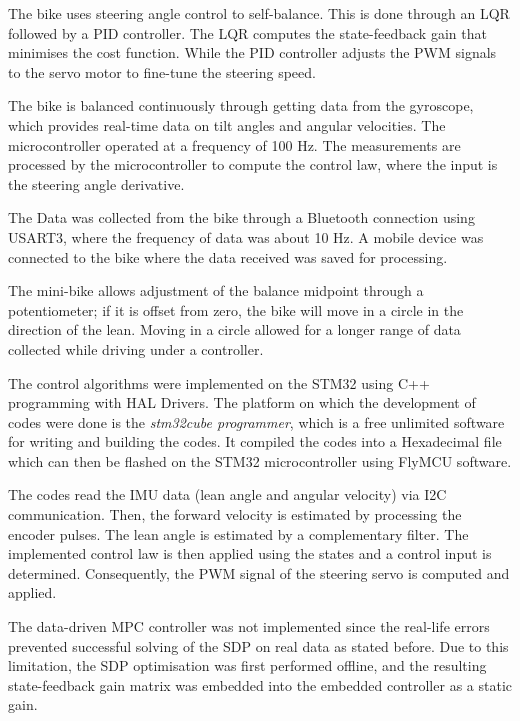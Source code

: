 
The bike uses steering angle control to self-balance. This is done through an LQR followed by a PID controller. The LQR computes the state-feedback gain that minimises the cost function. While the PID controller adjusts the PWM signals to the servo motor to fine-tune the steering speed.

The bike is balanced continuously through getting data from the gyroscope, which provides real-time data on tilt angles and angular velocities. The microcontroller operated at a frequency of 100 Hz. The measurements are processed by the microcontroller to compute the control law, where the input is the steering angle derivative.

The Data was collected from the bike through a Bluetooth connection using USART3, where the frequency of data was about 10 Hz. A mobile device was connected to the bike where the data received was saved for processing.

The mini-bike allows adjustment of the balance midpoint through a potentiometer; if it is offset from zero, the bike will move in a circle in the direction of the lean. Moving in a circle allowed for a longer range of data collected while driving under a controller.

The control algorithms were implemented on the STM32 using C++ programming with HAL Drivers.
The platform on which the development of codes were done is the \textit{stm32cube programmer}, which is a free unlimited software for writing and building the codes. It compiled the codes into a Hexadecimal file which can then be flashed on the STM32 microcontroller using FlyMCU software.

The codes read the IMU data (lean angle and angular velocity) via I2C communication. Then, the forward velocity is estimated by processing the encoder pulses. The lean angle is estimated by a complementary filter. The implemented control law is then applied using the states and a control input is determined. Consequently, the PWM signal of the steering servo is computed and applied.

The data-driven MPC controller was not implemented since the real-life errors prevented successful solving of the SDP on real data as stated before. Due to this limitation, the SDP optimisation was first performed offline, and the resulting state-feedback gain matrix was embedded into the embedded controller as a static gain.

